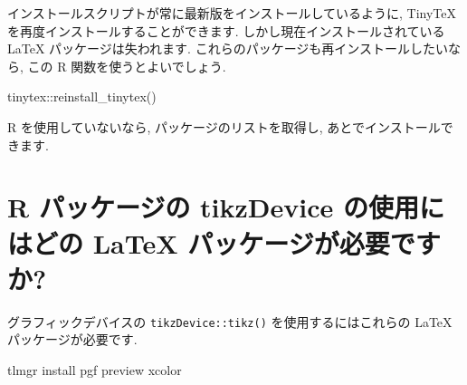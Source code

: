 \documentclass[
  xelatex,ja=standard,jafont=noto]{bxjsreport}
\newenvironment{Shaded}{\begin{snugshade}}{\end{snugshade}}
\newcommand{\AttributeTok}[1]{\textcolor[rgb]{0.77,0.63,0.00}{#1}}
\newcommand{\CommentTok}[1]{\textcolor[rgb]{0.56,0.35,0.01}{\textit{#1}}}
\newcommand{\ExtensionTok}[1]{#1}
\newcommand{\FunctionTok}[1]{\textcolor[rgb]{0.00,0.00,0.00}{#1}}
\newcommand{\KeywordTok}[1]{\textcolor[rgb]{0.13,0.29,0.53}{\textbf{#1}}}
\newcommand{\NormalTok}[1]{#1}
\newcommand{\SpecialCharTok}[1]{\textcolor[rgb]{0.00,0.00,0.00}{#1}}
\newcommand{\StringTok}[1]{\textcolor[rgb]{0.31,0.60,0.02}{#1}}
\newcommand{\VariableTok}[1]{\textcolor[rgb]{0.00,0.00,0.00}{#1}}
\begin{document}
インストールスクリプトが常に最新版をインストールしているように, TinyTeX
を再度インストールすることができます. しかし現在インストールされている
LaTeX パッケージは失われます.
これらのパッケージも再インストールしたいなら, この R
関数を使うとよいでしょう.

\begin{Shaded}
\begin{Highlighting}[numbers=left,,]
\NormalTok{tinytex}\SpecialCharTok{::}\FunctionTok{reinstall\_tinytex}\NormalTok{()}
\end{Highlighting}
\end{Shaded}

R を使用していないなら, パッケージのリストを取得し,
あとでインストールできます.

\begin{Shaded}
\end{Shaded}

\hypertarget{faq-tikz}{%
\section{R パッケージの tikzDevice の使用にはどの LaTeX
パッケージが必要ですか?}\label{faq-tikz}}

グラフィックデバイスの \texttt{tikzDevice::tikz()}
を使用するにはこれらの LaTeX パッケージが必要です.

\begin{Shaded}
\begin{Highlighting}[]
\ExtensionTok{tlmgr}\NormalTok{ install pgf preview xcolor}
\end{Highlighting}
\end{Shaded}
\end{document}
